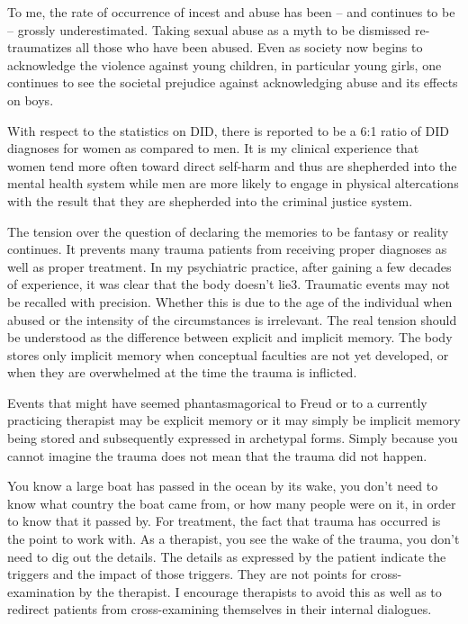 \documentclass[]{book}
\begin{document}
To me, the rate of occurrence of incest and abuse has been -- and continues to be -- grossly underestimated. Taking sexual abuse as a myth to be dismissed re-traumatizes all those who have been abused. Even as society now begins to acknowledge the violence against young children, in particular young girls, one continues to see the societal prejudice against acknowledging abuse and its effects on boys.

With respect to the statistics on DID, there is reported to be a 6:1 ratio of DID diagnoses for women as compared to men. It is my clinical experience that women tend more often toward direct self-harm and thus are shepherded into the mental health system while men are more likely to engage in physical altercations with the result that they are shepherded into the criminal justice system.

The tension over the question of declaring the memories to be fantasy or reality continues. It prevents many trauma patients from receiving proper diagnoses as well as proper treatment. In my psychiatric practice, after gaining a few decades of experience, it was clear that the body doesn't lie3. Traumatic events may not be recalled with precision. Whether this is due to the age of the individual when abused or the intensity of the circumstances is irrelevant. The real tension should be understood as the difference between explicit and implicit memory. The body stores only implicit memory when conceptual faculties are not yet developed, or when they are overwhelmed at the time the trauma is inflicted.

Events that might have seemed phantasmagorical to Freud or to a currently practicing therapist may be explicit memory or it may simply be implicit memory being stored and subsequently expressed in archetypal forms. Simply because you cannot imagine the trauma does not mean that the trauma did not happen.

You know a large boat has passed in the ocean by its wake, you don't need to know what country the boat came from, or how many people were on it, in order to know that it passed by. For treatment, the fact that trauma has occurred is the point to work with. As a therapist, you see the wake of the trauma, you don't need to dig out the details. The details as expressed by the patient indicate the triggers and the impact of those triggers. They are not points for cross-examination by the therapist. I encourage therapists to avoid this as well as to redirect patients from cross-examining themselves in their internal dialogues.
\end{document}
